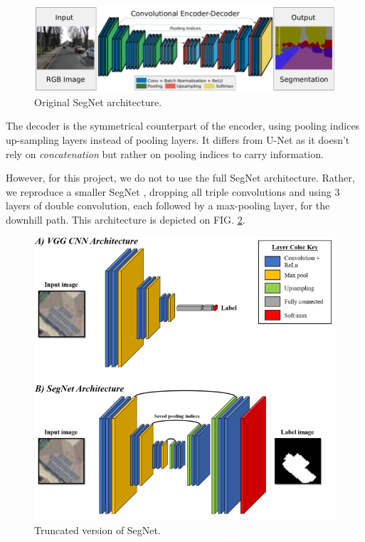 \documentclass[twocolumn,superscriptaddress,aps,nofootinbib]{revtex4-1}
\begin{document}
\begin{figure}[h]
    \centering
    \includegraphics[width=\columnwidth]{resources/png/segnet_architecture.png}
    \caption{Original SegNet architecture. \cite{badrinarayanan2017segnet}}
    \label{fig:segnet_original_architecture}
\end{figure}

The decoder is the symmetrical counterpart of the encoder, using pooling indices up-sampling layers instead of pooling layers. It differs from U-Net as it doesn't rely on \emph{concatenation} but rather on pooling indices to carry information.

However, for this project, we do not to use the full SegNet architecture. Rather, we reproduce a smaller SegNet \cite{camilo2018application}, dropping all triple convolutions and using 3 layers of double convolution, each followed by a max-pooling layer, for the downhill path. This architecture is depicted on FIG. \ref{fig:segnet_truncated}.

\begin{figure}[h]
    \centering
    \includegraphics[width=\columnwidth]{resources/png/segnet_truncated.png}
    \caption{Truncated version of SegNet. \cite{camilo2018application}}
    \label{fig:segnet_truncated}
\end{figure}
\end{document}
